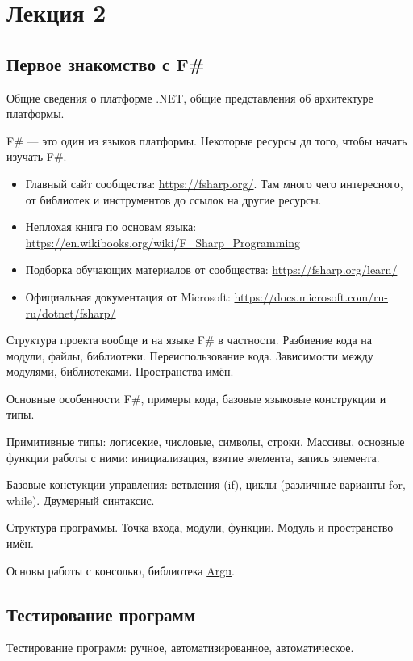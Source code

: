 \section{Лекция 2}

\subsection{Первое знакомство с F\#}

    Общие сведения о платформе .NET, общие представления об архитектуре платформы.

    F\# --- это один из языков платформы. 
    Некоторые ресурсы дл того, чтобы начать изучать F\#.
    \begin{itemize}
    	\item Главный сайт сообщества: \url{https://fsharp.org/}. Там много чего интересного, от библиотек и инструментов до ссылок на другие ресурсы. 
    	\item Неплохая книга по основам языка: \url{https://en.wikibooks.org/wiki/F_Sharp_Programming}
    	\item Подборка обучающих материалов от сообщества: \url{https://fsharp.org/learn/}
    	\item Официальная документация от Microsoft: \url{https://docs.microsoft.com/ru-ru/dotnet/fsharp/}
    \end{itemize}

    Структура проекта вообще и на языке F# в частности. Разбиение кода на модули, файлы, библиотеки. Переиспользование кода. Зависимости между модулями, библиотеками. Пространства имён.


    Основные особенности F\#, примеры кода, базовые языковые конструкции и типы.


    Примитивные типы: логисекие, числовые, символы, строки.
    Массивы, основные функции работы с ними: инициализация, взятие элемента, запись элемента.

    Базовые констукции управления: ветвления (if), циклы (различные варианты for, while). 
    Двумерный синтаксис.

    Структура программы. Точка входа, модули, функции. Модуль и пространство имён.

    Основы работы с консолью, библиотека \href{https://fsprojects.github.io/Argu/}{Argu}. 

\subsection{Тестирование программ}
    Тестирование программ: ручное, автоматизированное, автоматическое. 


